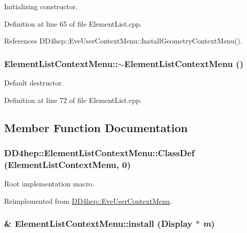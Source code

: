 Initializing constructor. 

Definition at line 65 of file ElementList.cpp.

References DD4hep::EveUserContextMenu::InstallGeometryContextMenu().\hypertarget{class_d_d4hep_1_1_element_list_context_menu_afb7e217c0f5eeeb14ab40b6e375bae39}{
\subsubsection[{$\sim$ElementListContextMenu}]{\setlength{\rightskip}{0pt plus 5cm}ElementListContextMenu::$\sim$ElementListContextMenu ()}}
\label{class_d_d4hep_1_1_element_list_context_menu_afb7e217c0f5eeeb14ab40b6e375bae39}


Default destructor. 

Definition at line 72 of file ElementList.cpp.

\subsection{Member Function Documentation}
\hypertarget{class_d_d4hep_1_1_element_list_context_menu_ab60b3abac1f709147788e8de09e8aebb}{
\subsubsection[{ClassDef}]{\setlength{\rightskip}{0pt plus 5cm}DD4hep::ElementListContextMenu::ClassDef ({\bf ElementListContextMenu}, \/  0)}}
\label{class_d_d4hep_1_1_element_list_context_menu_ab60b3abac1f709147788e8de09e8aebb}


Root implementation macro. 

Reimplemented from \hyperlink{class_d_d4hep_1_1_eve_user_context_menu_a05246cb30938d2a51dbb68468a3e8f8f}{DD4hep::EveUserContextMenu}.\hypertarget{class_d_d4hep_1_1_element_list_context_menu_aa7cb9b95de9a2e5ff1b4a152de62cd79}{
\subsubsection[{install}]{ \& ElementListContextMenu::install ({\bf Display} $\ast$ {\em m})}}
\label{class_d_d4hep_1_1_element_list_context_menu_aa7cb9b95de9a2e5ff1b4a152de62cd79}


